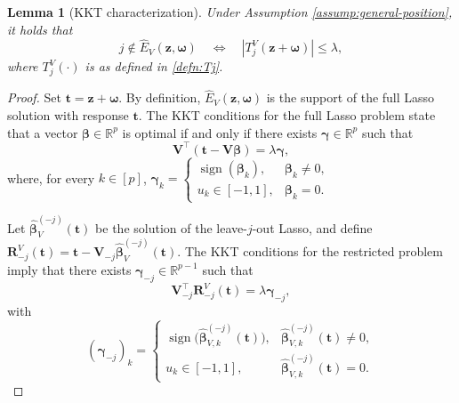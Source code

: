 \documentclass[12pt]{article}
\newtheorem{lemma}{Lemma}
\theoremstyle{definition}
\begin{document}
\begin{lemma}[KKT characterization]
\label{lem:leave-j-out-kkt}
Under Assumption \ref{assump:general-position}, it holds that
\[
    j\notin\widehat E_V(\boldsymbol z,\boldsymbol\omega)
    \quad\Longleftrightarrow\quad
    |T_j^V(\boldsymbol z+\boldsymbol\omega)|\le\lambda,
\]
where $T_j^V(\cdot)$ is as defined in \eqref{defn:Tj}.
\end{lemma}

\begin{proof}
Set $\boldsymbol t=\boldsymbol z+\boldsymbol\omega$. By definition,
$\widehat E_V(\boldsymbol z,\boldsymbol\omega)$ is the support of the
full Lasso solution with response $\boldsymbol t$.
The KKT conditions for the full Lasso problem state that a vector
$\boldsymbol{\beta}\in\mathbb R^p$ is optimal if and only if there exists
$\boldsymbol{\gamma}\in\mathbb R^p$ such that
\begin{equation}
    \boldsymbol V^\top(\boldsymbol t-\boldsymbol V\boldsymbol{\beta})=\lambda\boldsymbol{\gamma},
    \label{eq:full-lasso-kkt}
\end{equation}
where, for every $k\in[p]$,
$ \boldsymbol{\gamma}_k=
    \begin{cases}
        \operatorname{sign}(\boldsymbol{\beta}_k), & \boldsymbol{\beta}_k\ne0,\\
        u_k\in[-1,1], & \boldsymbol{\beta}_k=0.
    \end{cases}
$

Let $\widehat{\boldsymbol\beta}_V^{(-j)}(\boldsymbol t)$ be the solution of the leave-$j$-out
Lasso, and define
$\boldsymbol R_{-j}^V(\boldsymbol t)
    =
    \boldsymbol t-\boldsymbol V_{-j}\widehat{\boldsymbol\beta}_V^{(-j)}(\boldsymbol t).
$
The KKT conditions for the restricted problem imply that there exists
$\boldsymbol{\gamma}_{-j}\in\mathbb R^{p-1}$ such that
\begin{equation}
    \boldsymbol V_{-j}^\top \boldsymbol R_{-j}^V(\boldsymbol t)
    =
    \lambda\boldsymbol{\gamma}_{-j},
    \label{eq:restricted-lasso-kkt}
\end{equation}
with
\[
    (\boldsymbol{\gamma}_{-j})_k
    =
    \begin{cases}
        \operatorname{sign}
        \bigl(\widehat{\boldsymbol\beta}_{V,k}^{(-j)}(\boldsymbol t)\bigr),
        &
        \widehat{\boldsymbol\beta}_{V,k}^{(-j)}(\boldsymbol t)\ne0,\\
        u_k\in[-1,1],
        &
        \widehat{\boldsymbol\beta}_{V,k}^{(-j)}(\boldsymbol t)=0.
    \end{cases}
\]


\end{proof}
\end{document}

